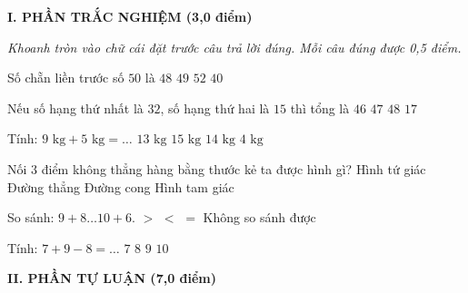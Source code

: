 
\setcounter{ex}{0}
\setcounter{bt}{0}

\textbf{\large I. PHẦN TRẮC NGHIỆM (3,0 điểm)}

{\itshape Khoanh tròn vào chữ cái đặt trước câu trả lời đúng. Mỗi câu đúng được 0,5 điểm.}

\begin{ex} %
Số chẵn liền trước số $50$ là
\choice
{\True $48$}
{$49$}
{$52$}
{$40$}
\end{ex}

\begin{ex} %
Nếu số hạng thứ nhất là $32$, số hạng thứ hai là $15$ thì tổng là
\choice
{$46$}
{\True $47$}
{$48$}
{$17$}
\end{ex}

\begin{ex} %
Tính: $9\text{ kg} + 5\text{ kg} = \dots$
\choice
{$13\text{ kg}$}
{$15\text{ kg}$}
{\True $14\text{ kg}$}
{$4\text{ kg}$}
\end{ex}

\begin{ex} %
Nối $3$ điểm không thẳng hàng bằng thước kẻ ta được hình gì?
\choice
{Hình tứ giác}
{Đường thẳng}
{Đường cong}
{\True Hình tam giác}
\end{ex}

\begin{ex} %
So sánh: $9 + 8 \dots 10 + 6$.
\choice
{\True $>$}
{$<$}
{$=$}
{Không so sánh được}
\end{ex}

\begin{ex} %
Tính: $7 + 9 - 8 = \dots$
\choice
{$7$}
{\True $8$}
{$9$}
{$10$}
\end{ex}

\vspace{4mm}
\textbf{\large II. PHẦN TỰ LUẬN (7,0 điểm)}

